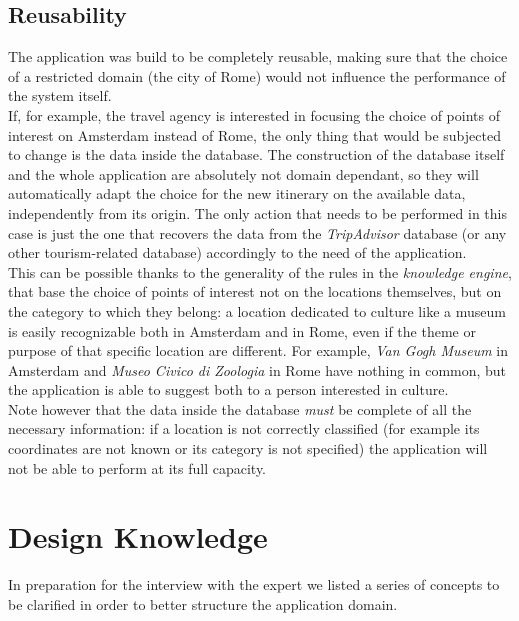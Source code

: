 \documentclass[11pt]{article} %
\renewcommand\appendix{\par
  \setcounter{section}{0}
  \setcounter{subsection}{0}
  \setcounter{figure}{0}
  \setcounter{table}{0}
  \renewcommand\thesection{Appendix \Alph{section}}
  \renewcommand\thefigure{\Alph{section}\arabic{figure}}
  \renewcommand\thetable{\Alph{section}\arabic{table}}
}
\begin{document}
\subsection{Reusability} \label{sec:reusability}
The application was build to be completely reusable, making sure that the choice of a restricted domain (the city of Rome) would not influence the performance of the system itself.\\
\indent If, for example, the travel agency is interested in focusing the choice of points of interest on Amsterdam instead of Rome, the only thing that would be subjected to change is the data inside the database. The construction of the database itself and the whole application are absolutely not domain dependant, so they will automatically adapt the choice for the new itinerary on the available data, independently from its origin. The only action that needs to be performed in this case is just the one that recovers the data from the \textit{TripAdvisor} database (or any other tourism-related database) accordingly to the need of the application.\\
\indent This can be possible thanks to the generality of the rules in the \textit{knowledge engine}, that base the choice of points of interest not on the locations themselves, but on the category to which they belong: a location dedicated to culture like a museum is easily recognizable both in Amsterdam and in Rome, even if the theme or purpose of that specific location are different. For example, \textit{Van Gogh Museum} in Amsterdam and \textit{Museo Civico di Zoologia} in Rome have nothing in common, but the application is able to suggest both to a person interested in culture.\\
\indent Note however that the data inside the database \textit{must} be complete of all the necessary information: if a location is not correctly classified (for example its coordinates are not known or its category is not specified) the application will not be able to perform at its full capacity.


\newpage

\appendix
\section{Design Knowledge}

In preparation for the interview with the expert we listed a series of concepts to be clarified in order to better structure the application domain. 
\end{document}
